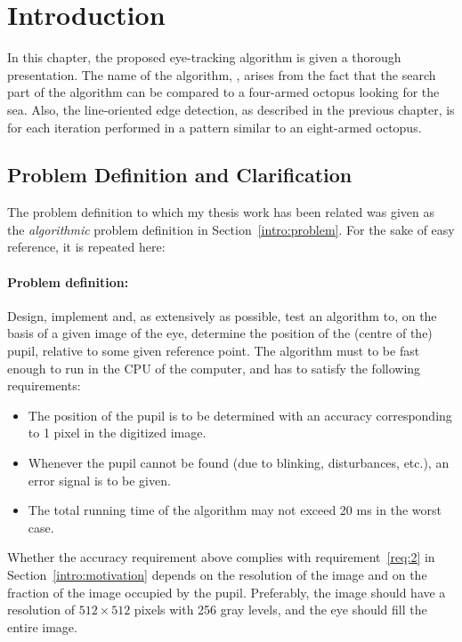 
\section{Introduction}
\label{algo:intro}

In this chapter, the proposed eye-tracking algorithm is given a
thorough presentation.  The name of the algorithm, {\octopus}, arises
from the fact that the search part of the algorithm can be compared to
a four-armed octopus looking for the sea.  Also, the line-oriented
edge detection, as described in the previous chapter, is for each
iteration performed in a pattern similar to an eight-armed octopus.

\subsection{Problem Definition and Clarification}
\label{algo:intro:problem}

The problem definition to which my thesis work has been related was
given as the {\em algorithmic\/} problem definition in
Section~\ref{intro:problem}.  For the sake of easy reference, it is
repeated here:

\paragraph{Problem definition:}
Design, implement and, as extensively as possible, test an algorithm
to, on the basis of a given image of the eye, determine the position
of the (centre of the) pupil, relative to some given reference point.
The algorithm must to be fast enough to run in the CPU of the
computer, and has to satisfy the following requirements:
\begin{itemize}
\item The position of the pupil is to be determined with an accuracy
  corresponding to 1 pixel in the digitized image.
\item Whenever the pupil cannot be found (due to blinking,
  disturbances, etc.), an error signal is to be given.
\item The total running time of the algorithm may not exceed 20 ms in
  the worst case.
\end{itemize}
Whether the accuracy requirement above complies with
requirement~\ref{req:2} in Section~\ref{intro:motivation} depends on
the resolution of the image and on the fraction of the image occupied
by the pupil.  Preferably, the image should have a resolution of
$512\times 512$ pixels with 256 gray levels, and the eye should fill
the entire image.
\vspace*{0.5cm}

